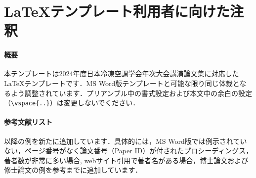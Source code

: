 \documentclass[A4,10pt,fleqn,dvipdfmx]{jarticle}
\begin{document}





\nocite{*}  %



\normalfont
\section*{LaTeXテンプレート利用者に向けた注釈}
\paragraph*{概要}本テンプレートは2024年度日本冷凍空調学会年次大会講演論文集に対応したLaTeXテンプレートです．MS Word版テンプレートと可能な限り同じ体裁となるよう調整されています．プリアンブル中の書式設定および本文中の余白の設定（\verb|\vspace{..}|）は変更しないでください．
\paragraph*{参考文献リスト} \cite{Higashi2016}以降の例を新たに追加しています．具体的には，MS Word版では例示されていない，ページ番号がなく論文番号（Paper ID）が付されたプロシーディングス\cite{Higashi2016}，著者数が非常に多い場合\cite{IPCC2013}, webサイト引用で著者名がある場合\cite{ASHRAE2019}，博士論文\cite{Reito2017}および修士論文\cite{Kucho2008}の例を参考までに追加しています．



\label{lastpage} %
\end{document}
